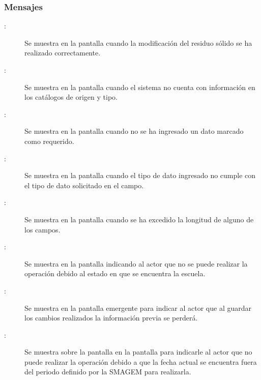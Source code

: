 \subsubsection{Mensajes}

    \begin{description}
      
	    \item [:] Se muestra en la pantalla  cuando la modificación del residuo sólido se ha realizado correctamente.	    
	    
	    \item [:] Se muestra en la pantalla  cuando el sistema no cuenta con información en los catálogos de origen y tipo.
	    
	    \item [:] Se muestra en la pantalla  cuando no se ha ingresado un dato marcado como requerido.
	    
	     \item [:] Se muestra en la pantalla  cuando el tipo de dato ingresado no cumple con el tipo de dato solicitado en el campo.
	    
	    \item [:] Se muestra en la pantalla  cuando se ha excedido la longitud de alguno de los campos.

	    \item[:] Se muestra en la pantalla  indicando al actor que no se puede realizar la operación debido al estado en que se encuentra la escuela.
	   
	   \item [:] Se muestra en la pantalla emergente  para indicar al actor que al guardar los cambios realizados la información previa se perderá.
	   
	   \item [:] Se muestra sobre la pantalla en la pantalla  para indicarle al actor que no puede realizar la operación debido a que la fecha actual se encuentra fuera del periodo definido por la SMAGEM para realizarla.
	   
    \end{description}
